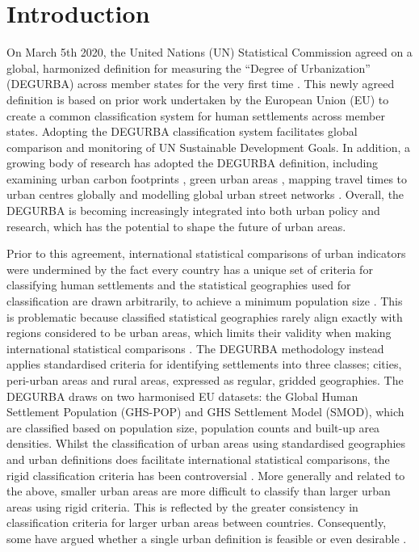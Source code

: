\documentclass[review]{elsarticle}
\begin{document}
	
	
	\section{Introduction}
	On March 5th 2020, the United Nations (UN) Statistical Commission agreed on a global, harmonized definition for measuring the ``Degree of Urbanization'' (DEGURBA) across member states for the very first time \cite{UN2020}.
	This newly agreed definition is based on prior work undertaken by the European Union (EU) to create a common classification system for human settlements across member states.
	Adopting the DEGURBA classification system facilitates global comparison and monitoring of UN Sustainable Development Goals.
	In addition, a growing body of research has adopted the DEGURBA definition, 
	including examining urban carbon footprints \cite{Moranetal2018}, green urban areas \cite{Corbaneetal2018}, mapping travel times to urban centres globally \cite{Weissetal2018} and modelling global urban street networks \cite{Boeing2021}.
	Overall, the DEGURBA is becoming increasingly integrated into both urban policy and research, which has the potential to shape the future of urban areas.
	
	
	Prior to this agreement, international statistical comparisons of urban indicators were undermined by the fact every country has a unique set of criteria for classifying human settlements and the statistical geographies used for classification are drawn arbitrarily, to achieve a minimum population size \cite{Foxetal2017}.
	This is problematic because classified statistical geographies rarely align exactly with regions considered to be urban areas, which limits their validity when making international statistical comparisons \cite{Buettner2015, Taubenboecketal2017}.
	The DEGURBA methodology instead applies standardised criteria for identifying settlements into three classes; cities, peri-urban areas and rural areas, expressed as regular, gridded geographies.
	The DEGURBA draws on two harmonised EU datasets: the Global Human Settlement Population (GHS-POP) and GHS Settlement Model (SMOD), which are classified based on population size, population counts and built-up area densities. 
	Whilst the classification of urban areas using standardised geographies and urban definitions does facilitate international statistical comparisons, the rigid classification criteria has been controversial \cite{Angeletal2019,Ondaetal2019}.
	More generally and related to the above, smaller urban areas are more difficult to classify than larger urban areas using rigid criteria.
	This is reflected by the greater consistency in classification criteria for larger urban areas between countries.
	Consequently, some have argued whether a single urban definition is feasible or even desirable \cite{Saladin2016}.
	
\end{document}
